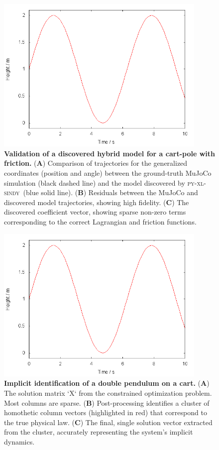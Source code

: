 \documentclass[12pt]{article}
\newcommand{\frameworkname}{\textsc{py-xl-sindy}}
\begin{document}
\begin{figure}
	\centering
	\includegraphics[width=0.9\textwidth]{placeholder.png}
	\caption{\textbf{Validation of a discovered hybrid model for a cart-pole with friction.} 
    (\textbf{A}) Comparison of trajectories for the generalized coordinates (position and angle) between the ground-truth MuJoCo simulation (black dashed line) and the model discovered by \frameworkname\ (blue solid line). (\textbf{B}) Residuals between the MuJoCo and discovered model trajectories, showing high fidelity. (\textbf{C}) The discovered coefficient vector, showing sparse non-zero terms corresponding to the correct Lagrangian and friction functions.}
	\label{fig:trajectory_validation}
\end{figure}

\begin{figure}
	\centering
	\includegraphics[width=0.9\textwidth]{placeholder.png}
	\caption{\textbf{Implicit identification of a double pendulum on a cart.} 
    (\textbf{A}) The solution matrix `X` from the constrained optimization problem. Most columns are sparse. (\textbf{B}) Post-processing identifies a cluster of homothetic column vectors (highlighted in red) that correspond to the true physical law. (\textbf{C}) The final, single solution vector extracted from the cluster, accurately representing the system's implicit dynamics.}
	\label{fig:implicit_results}
\end{figure}
\end{document}
